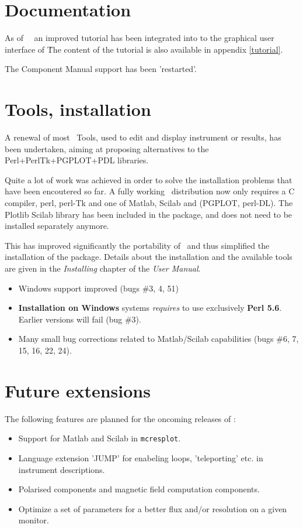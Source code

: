 \section{Documentation}
\label{s:new-features:documentation}
As of \MCS\ \version\ an improved tutorial has been integrated
into to the graphical user interface of \MCS\. The content of the
tutorial is also available in appendix \ref{tutorial}.

The Component Manual support has been 'restarted'.

\section{Tools, installation}
\label{s:new-features:tools}
  A renewal of most \MCS\ Tools, used to edit and display instrument or
  results,  has been undertaken, aiming at proposing alternatives to the
  Perl+PerlTk+PGPLOT+PDL  libraries.

  Quite a lot of work was achieved in order to solve the installation problems
   that have been encoutered so far. A fully working \MCS\ distribution now
   only requires a C compiler, perl, perl-Tk and one of Matlab, Scilab and
   (PGPLOT, perl-DL). The Plotlib Scilab library has  been included in the
   package, and does not need to be installed separately anymore.

  This has improved significantly the portability of \MCS\ and thus simplified
  the installation of the package. Details about the installation and the
  available tools are given in the {\it Installing \MCS} chapter of the {\it User Manual}.

\begin{itemize}
\item Windows support improved (bugs \#3, 4, 51)
\item {\bf Installation on Windows} systems \emph{requires} to use exclusively {\bf Perl 5.6}. Earlier versions will fail (bug \#3).
\item Many small bug corrections related to Matlab/Scilab capabilities (bugs \#6, 7, 15, 16, 22, 24).
\end{itemize}

\section{Future extensions}
\label{s:future}
The following features are planned for the oncoming releases of \MCS :
\begin{itemize}
\item Support for Matlab and Scilab in \verb+mcresplot+.
\item Language extension 'JUMP' for enabeling loops, 'teleporting'
  etc. in instrument descriptions.
\item Polarised components and magnetic field computation components.
\item Optimize a set of parameters for a better flux and/or resolution on a given monitor.
\end{itemize}








